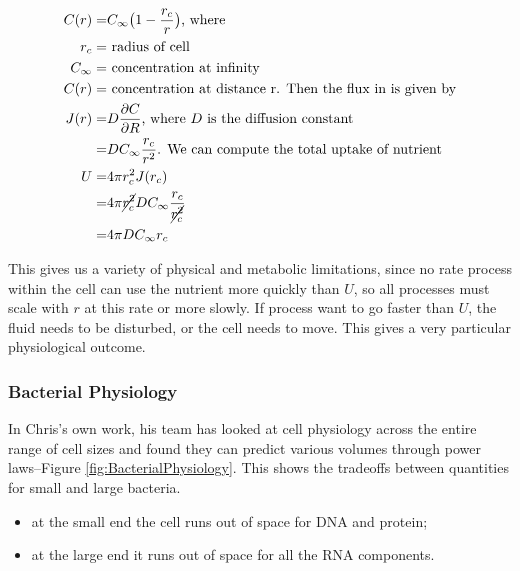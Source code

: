 \documentclass[]{article}
\begin{document}
\begin{align*}
	C(r) =& C_{\infty}\big(1 - \frac{r_c}{r}\big)\text{, where}\\
	r_c=& \text{ radius of cell}\\
	C_{\infty} =& \text{ concentration at infinity}\\
	C(r) =& \text{ concentration at distance r. Then the flux in is given by}\\
	J(r) =& D\frac{\partial C}{\partial R} \text{, where $D$ is the diffusion constant}\\
	  =& D C_{\infty} \frac{r_c}{r^2}\text{. We can compute the total uptake of nutrient}\\
	U =& 4 \pi r_c^2 J(r_c) \\
	=& 4 \pi\cancel{ r_c^2} D C_{\infty} \frac{r_c}{\cancel{r_c^2}}\\
	=&4 \pi D C_{\infty} r_c 
\end{align*}

This gives us a variety of physical and metabolic limitations, since no rate process within the cell can use the nutrient more quickly than $U$, so all processes must scale with $r$ at this rate or more slowly. If process want to go faster than $U$, the fluid needs to be disturbed, or the cell needs to move. This gives a very particular physiological outcome.

\subsubsection{Bacterial Physiology}

In Chris's own work, his team has looked at cell physiology across the entire range of cell sizes and found they can predict various volumes through power laws--Figure \ref{fig:BacterialPhysiology}. This shows the tradeoffs between quantities for small and large bacteria.
\begin{itemize}
	\item at the small end the cell runs out of space for DNA and protein;
	\item at the large end it runs out of space for all the RNA components.
\end{itemize}
\end{document}
